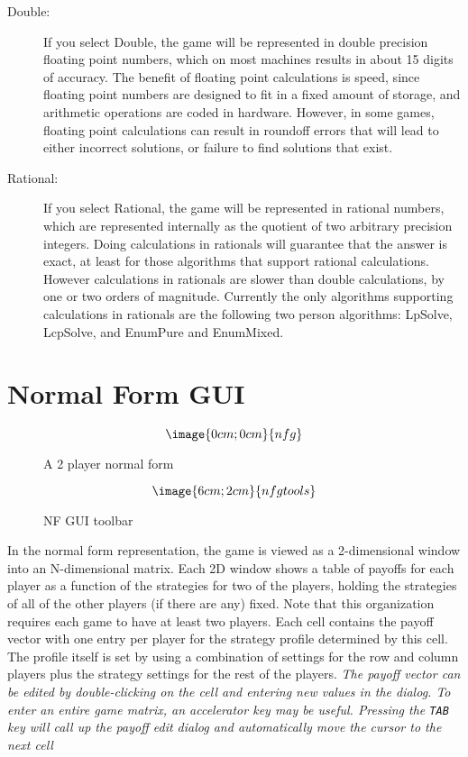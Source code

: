 \begin{description}
\item[Double:]  If you select Double, the game will be represented in double precision floating
 point numbers, which on most machines results in about 15 digits of accuracy.  The benefit of 
floating point calculations is speed, since floating point numbers are designed to fit in a fixed 
amount of storage, and arithmetic operations are coded in hardware.  However,  in some games, 
floating point calculations can result in roundoff errors that will lead to either incorrect 
solutions, or failure to find solutions that exist.  
\item[Rational:]  If you select Rational, the game will be represented in rational numbers, 
which are represented internally as the quotient of two arbitrary precision integers.  Doing 
calculations in rationals will guarantee that the answer is exact, at least for those algorithms 
that support rational calculations.  However calculations in rationals are slower than double 
calculations, by one or two orders of magnitude.  Currently the only algorithms supporting 
calculations in rationals are the following two person algorithms: LpSolve, LcpSolve, and 
EnumPure and EnumMixed.  
\end{description}

\section{Normal Form GUI}

\begin{figure}
$$\image{0cm;0cm}{nfg}$$
\caption{A 2 player normal form}\label{fig_nfg}
\end{figure}

\begin{figure}
$$\image{6cm;2cm}{nfgtools}$$
\caption{NF GUI toolbar}\label{fig_nfgtools}
\end{figure}

In the normal form representation, the game is viewed as a 2-dimensional
window into an N-dimensional matrix.  Each 2D window shows a table of
payoffs for each player as a function of the strategies for two of the
players, holding the strategies of all of the other players (if there are
any) fixed.  Note that this organization requires each game to have at least
two players.  Each cell contains the payoff vector with one entry per
player for the strategy profile determined by this cell.  The profile
itself is set by using a combination of settings for the row and column
players plus the strategy settings for the rest of the players.  {\em The
payoff vector can be edited by double-clicking on the cell and entering
new values in the dialog. To enter an entire game matrix, an accelerator
key may be useful.  Pressing the {\tt TAB} key will call up the payoff
edit dialog and automatically move the cursor to the next cell}

